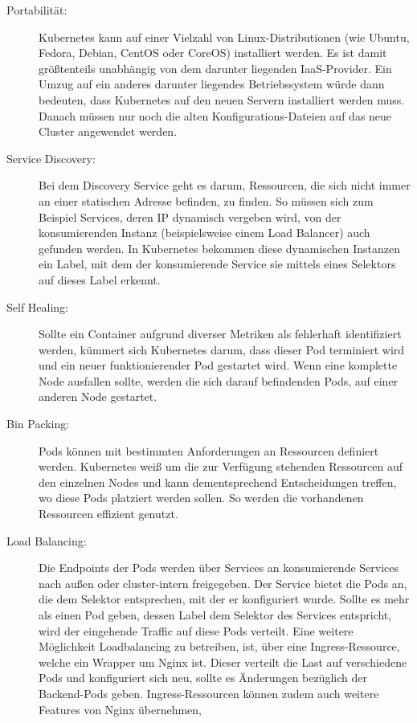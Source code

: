 \begin{description}
  \item[Portabilität:]
  Kubernetes kann auf einer Vielzahl von Linux-Distributionen
  (wie Ubuntu, Fedora, Debian, CentOS oder CoreOS) installiert werden.
  Es ist damit
  größtenteils unabhängig von dem darunter liegenden IaaS-Provider. Ein Umzug
  auf ein
  anderes darunter liegendes Betriebssystem würde dann bedeuten,
  dass Kubernetes
  auf den neuen Servern installiert werden muss. Danach müssen nur noch
  die alten Konfigurations-Dateien auf das neue Cluster angewendet werden.
  \item[Service Discovery:]
  Bei dem Discovery Service geht es darum, Ressourcen, die sich nicht immer an einer
  statischen
  Adresse befinden, zu finden. So müssen sich zum Beispiel Services, deren IP
  dynamisch vergeben wird,
  von der konsumierenden Instanz (beispielsweise einem Load Balancer) auch
  gefunden werden.
  In Kubernetes bekommen diese dynamischen Instanzen ein Label, mit dem der
  konsumierende Service sie
  mittels eines Selektors auf dieses Label erkennt.
  \item[Self Healing:]
  Sollte ein Container aufgrund diverser Metriken als fehlerhaft
  identifiziert werden,
  kümmert sich
  Kubernetes darum, dass dieser Pod terminiert wird und ein neuer
  funktionierender Pod gestartet wird.
  Wenn eine komplette Node ausfallen sollte, werden die sich darauf befindenden
  Pods, auf einer anderen Node gestartet.
  \item[Bin Packing:]
  Pods können mit bestimmten Anforderungen an Ressourcen definiert werden.
  Kubernetes weiß um
  die zur Verfügung stehenden Ressourcen auf den einzelnen Nodes und kann
  dementsprechend
  Entscheidungen treffen, wo diese Pods platziert werden sollen. So werden die
  vorhandenen
  Ressourcen effizient genutzt.
  \item[Load Balancing:]
  Die Endpoints der Pods werden über Services an konsumierende Services nach
  außen oder cluster-intern freigegeben. Der Service bietet die Pods an, die dem
  Selektor entsprechen, mit der er konfiguriert wurde. Sollte es mehr als einen
  Pod geben,
  dessen Label dem Selektor des Services entspricht, wird der eingehende
  Traffic auf diese Pods verteilt.
  Eine weitere Möglichkeit Loadbalancing zu betreiben, ist, über eine
  Ingress-Ressource,
  welche ein Wrapper um Nginx ist. Dieser verteilt die Last auf verschiedene Pods
  und
  konfiguriert sich neu, sollte es Änderungen bezüglich der Backend-Pods geben.
  Ingress-Ressourcen können zudem auch weitere Features von Nginx übernehmen,

\end{description}

